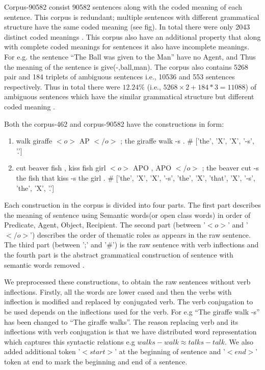Corpus-90582 consist 90582 sentences along with the coded meaning of each sentence. This corpus is redundant; multiple sentences with different grammatical structure have the same coded meaning (see fig). In total there were only 2043 distinct coded meanings \cite{xavier:2013:RT}. This corpus also have an additional property that along with complete coded meanings for sentences it also have incomplete meanings. For e.g. the sentence “The Ball was given to the Man” have no Agent, and Thus the meaning of the sentence is give(-,ball,man). The corpus also contains 5268 pair and 184 triplets of ambiguous sentences i.e., 10536 and 553 sentences respectively. Thus in total there were $12.24 \%$ (i.e., $ 5268 \times 2+184*3=11088 $) of ambiguous sentences which have the similar grammatical structure but different coded meaning \cite{xavier:2013:RT}.
	 
Both the corpus-462 and corpus-90582 have the constructions in form:

\begin{enumerate}[noitemsep]
\item walk giraffe $<o>$ AP $</o>$ ; the giraffe walk -s . \# ['the', 'X', 'X', '-s', '.']
\item cut beaver fish , kiss fish girl $<o>$ APO , APO $</o>$ ; the beaver cut -s the fish that kiss -s the girl . \# ['the', 'X', 'X', '-s', 'the', 'X', 'that', 'X', '-s', 'the', 'X', '.']
\end{enumerate}

Each construction in the corpus is divided into four parts. The first part describes the meaning of sentence using Semantic words(or open class words) in order of Predicate, Agent, Object, Recipient. The second part (between '$<o>$' and '$</o>$') describes the order of thematic roles as appears in the raw sentence. The third part (between ';' and '\#') is the raw sentence with verb inflections and the fourth part is the abstract grammatical construction of sentence with semantic words removed \cite{xavier:2013:RT}.

We preprocessed these constructions, to obtain the raw sentences without verb inflections. Firstly, all the words are lower cased and then the verbs with inflection is modified and replaced by conjugated verb. The verb conjugation to be used depends on the inflections used for the verb. For e.g “The giraffe walk -s” has been changed to “The giraffe walks”. The reason replacing verb and its inflections with verb conjugation is that we have distributed word representation which captures this syntactic relations e.g $walks - walk \approx talks - talk$. We also added additional token '$<start>$' at the beginning of sentence and '$<end>$' token at end to mark the beginning and end of a sentence.
  

